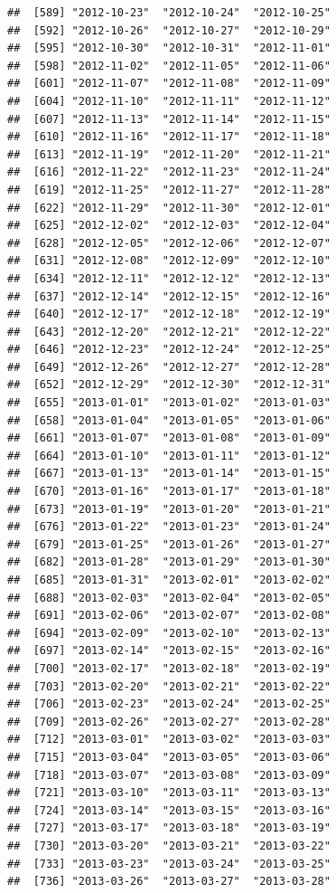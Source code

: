 \documentclass[10pt]{article}\usepackage[]{graphicx}\usepackage[]{color}
\makeatletter
\newenvironment{kframe}{%
 \def\at@end@of@kframe{}%
 \ifinner\ifhmode%
  \def\at@end@of@kframe{\end{minipage}}%
  \begin{minipage}{\columnwidth}%
 \fi\fi%
 \def\FrameCommand##1{\hskip\@totalleftmargin \hskip-\fboxsep
 \colorbox{shadecolor}{##1}\hskip-\fboxsep
     \hskip-\linewidth \hskip-\@totalleftmargin \hskip\columnwidth}%
 \MakeFramed {\advance\hsize-\width
   \@totalleftmargin\z@ \linewidth\hsize
   \@setminipage}}%
 {\par\unskip\endMakeFramed%
 \at@end@of@kframe}
\newenvironment{knitrout}{}{} %
\theoremstyle{plain}
\makeatother
\begin{document}
\begin{knitrout}
\begin{kframe}
\begin{verbatim}
##  [589] "2012-10-23"  "2012-10-24"  "2012-10-25" 
##  [592] "2012-10-26"  "2012-10-27"  "2012-10-29" 
##  [595] "2012-10-30"  "2012-10-31"  "2012-11-01" 
##  [598] "2012-11-02"  "2012-11-05"  "2012-11-06" 
##  [601] "2012-11-07"  "2012-11-08"  "2012-11-09" 
##  [604] "2012-11-10"  "2012-11-11"  "2012-11-12" 
##  [607] "2012-11-13"  "2012-11-14"  "2012-11-15" 
##  [610] "2012-11-16"  "2012-11-17"  "2012-11-18" 
##  [613] "2012-11-19"  "2012-11-20"  "2012-11-21" 
##  [616] "2012-11-22"  "2012-11-23"  "2012-11-24" 
##  [619] "2012-11-25"  "2012-11-27"  "2012-11-28" 
##  [622] "2012-11-29"  "2012-11-30"  "2012-12-01" 
##  [625] "2012-12-02"  "2012-12-03"  "2012-12-04" 
##  [628] "2012-12-05"  "2012-12-06"  "2012-12-07" 
##  [631] "2012-12-08"  "2012-12-09"  "2012-12-10" 
##  [634] "2012-12-11"  "2012-12-12"  "2012-12-13" 
##  [637] "2012-12-14"  "2012-12-15"  "2012-12-16" 
##  [640] "2012-12-17"  "2012-12-18"  "2012-12-19" 
##  [643] "2012-12-20"  "2012-12-21"  "2012-12-22" 
##  [646] "2012-12-23"  "2012-12-24"  "2012-12-25" 
##  [649] "2012-12-26"  "2012-12-27"  "2012-12-28" 
##  [652] "2012-12-29"  "2012-12-30"  "2012-12-31" 
##  [655] "2013-01-01"  "2013-01-02"  "2013-01-03" 
##  [658] "2013-01-04"  "2013-01-05"  "2013-01-06" 
##  [661] "2013-01-07"  "2013-01-08"  "2013-01-09" 
##  [664] "2013-01-10"  "2013-01-11"  "2013-01-12" 
##  [667] "2013-01-13"  "2013-01-14"  "2013-01-15" 
##  [670] "2013-01-16"  "2013-01-17"  "2013-01-18" 
##  [673] "2013-01-19"  "2013-01-20"  "2013-01-21" 
##  [676] "2013-01-22"  "2013-01-23"  "2013-01-24" 
##  [679] "2013-01-25"  "2013-01-26"  "2013-01-27" 
##  [682] "2013-01-28"  "2013-01-29"  "2013-01-30" 
##  [685] "2013-01-31"  "2013-02-01"  "2013-02-02" 
##  [688] "2013-02-03"  "2013-02-04"  "2013-02-05" 
##  [691] "2013-02-06"  "2013-02-07"  "2013-02-08" 
##  [694] "2013-02-09"  "2013-02-10"  "2013-02-13" 
##  [697] "2013-02-14"  "2013-02-15"  "2013-02-16" 
##  [700] "2013-02-17"  "2013-02-18"  "2013-02-19" 
##  [703] "2013-02-20"  "2013-02-21"  "2013-02-22" 
##  [706] "2013-02-23"  "2013-02-24"  "2013-02-25" 
##  [709] "2013-02-26"  "2013-02-27"  "2013-02-28" 
##  [712] "2013-03-01"  "2013-03-02"  "2013-03-03" 
##  [715] "2013-03-04"  "2013-03-05"  "2013-03-06" 
##  [718] "2013-03-07"  "2013-03-08"  "2013-03-09" 
##  [721] "2013-03-10"  "2013-03-11"  "2013-03-13" 
##  [724] "2013-03-14"  "2013-03-15"  "2013-03-16" 
##  [727] "2013-03-17"  "2013-03-18"  "2013-03-19" 
##  [730] "2013-03-20"  "2013-03-21"  "2013-03-22" 
##  [733] "2013-03-23"  "2013-03-24"  "2013-03-25" 
##  [736] "2013-03-26"  "2013-03-27"  "2013-03-28" 

\end{verbatim}
\end{kframe}
\end{knitrout}
\end{document}
